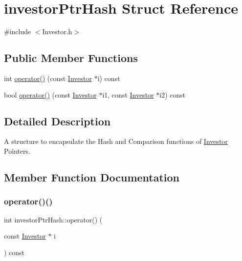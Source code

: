 \hypertarget{structinvestor_ptr_hash}{}\section{investor\+Ptr\+Hash Struct Reference}
\label{structinvestor_ptr_hash}


{\ttfamily \#include $<$Investor.\+h$>$}

\subsection*{Public Member Functions}
\begin{DoxyCompactItemize}
\item 
int \hyperlink{structinvestor_ptr_hash_af2bea253d87fd0752e2456f0c92fcd8e}{operator()} (const \hyperlink{class_investor}{Investor} $\ast$i) const
\item 
bool \hyperlink{structinvestor_ptr_hash_a121a824a56efb5597de907cf916f8b52}{operator()} (const \hyperlink{class_investor}{Investor} $\ast$i1, const \hyperlink{class_investor}{Investor} $\ast$i2) const
\end{DoxyCompactItemize}


\subsection{Detailed Description}
A structure to encapsulate the Hash and Comparison functions of \hyperlink{class_investor}{Investor} Pointers. 

\subsection{Member Function Documentation}
\mbox{\label{structinvestor_ptr_hash_af2bea253d87fd0752e2456f0c92fcd8e}} 
\subsubsection{\texorpdfstring{operator()()}{operator()()}\hspace{0.1cm}{\footnotesize\ttfamily [1/2]}}
{\footnotesize\ttfamily int investor\+Ptr\+Hash\+::operator() (\begin{DoxyParamCaption}\item[{const \hyperlink{class_investor}{Investor} $\ast$}]{i }\end{DoxyParamCaption}) const\hspace{0.3cm}{\ttfamily [inline]}}

